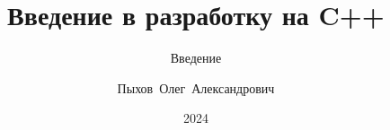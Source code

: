 \documentclass{beamer}
\title{Введение в разработку на C++}
\subtitle{Введение}
\author{Пыхов~Олег~Александрович\inst{1}}
\institute{
    \inst{1}%
    ООО~"Прософт-Системы"
}
\date{2024}
\begin{document}
\frame{\titlepage}
\end{document}

